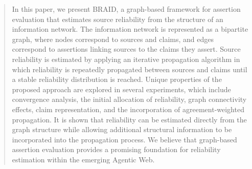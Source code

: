 \begin{abstract}

In this paper, we present BRAID, a graph-based framework for assertion evaluation that estimates source reliability from the structure of an information network. The information network is represented as a bipartite graph, where nodes correspond to sources and claims, and edges correspond to assertions linking sources to the claims they assert. Source reliability is estimated by applying an iterative propagation algorithm in which reliability is repeatedly propagated between sources and claims until a stable reliability distribution is reached. Unique properties of the proposed approach are explored in several experiments, which include convergence analysis, the initial allocation of reliability, graph connectivity effects, claim representation, and the incorporation of agreement-weighted propagation. It is shown that reliability can be estimated directly from the graph structure while allowing additional structural information to be incorporated into the propagation process. We believe that graph-based assertion evaluation provides a promising foundation for reliability estimation within the emerging Agentic Web.

\end{abstract}

